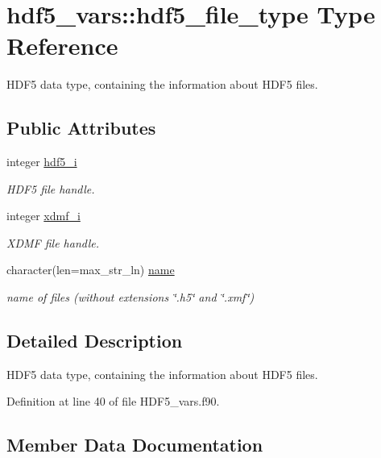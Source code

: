 \hypertarget{structhdf5__vars_1_1hdf5__file__type}{}\section{hdf5\+\_\+vars\+:\+:hdf5\+\_\+file\+\_\+type Type Reference}
\label{structhdf5__vars_1_1hdf5__file__type}


H\+D\+F5 data type, containing the information about H\+D\+F5 files.  


\subsection*{Public Attributes}
\begin{DoxyCompactItemize}
\item 
integer \hyperlink{structhdf5__vars_1_1hdf5__file__type_acf16efd8f5252ce4b92366350a7336b5}{hdf5\+\_\+i}
\begin{DoxyCompactList}\small\item\em H\+D\+F5 file handle. \end{DoxyCompactList}\item 
integer \hyperlink{structhdf5__vars_1_1hdf5__file__type_aceb5b42fcc6d848f1b0faaa9042b1a95}{xdmf\+\_\+i}
\begin{DoxyCompactList}\small\item\em X\+D\+MF file handle. \end{DoxyCompactList}\item 
character(len=max\+\_\+str\+\_\+ln) \hyperlink{structhdf5__vars_1_1hdf5__file__type_a1739de1996623e79605d5000ffe97156}{name}
\begin{DoxyCompactList}\small\item\em name of files (without extensions \char`\"{}.\+h5\char`\"{} and \char`\"{}.\+xmf\char`\"{}) \end{DoxyCompactList}\end{DoxyCompactItemize}


\subsection{Detailed Description}
H\+D\+F5 data type, containing the information about H\+D\+F5 files. 

Definition at line 40 of file H\+D\+F5\+\_\+vars.\+f90.



\subsection{Member Data Documentation}
\mbox{\label{structhdf5__vars_1_1hdf5__file__type_acf16efd8f5252ce4b92366350a7336b5}} 
